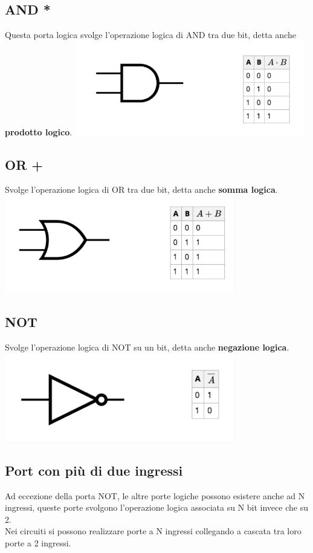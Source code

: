 \documentclass[12pt, a4paper, openany]{book}
\begin{document}
\subsection{AND *}
Questa porta logica svolge l'operazione logica di AND tra due bit, detta anche 
\textbf{prodotto logico}.
\includegraphics[width=100mm, scale=0.6]{tabella_and.png}

\subsection{OR +}
Svolge l'operazione logica di OR tra due bit, detta anche \textbf{somma logica}.
\includegraphics[width=100mm, scale=0.6]{tabella_or.png}

\subsection{NOT}
Svolge l'operazione logica di NOT su un bit, detta anche \textbf{negazione logica}.
\includegraphics[width=100mm, scale=0.6]{tabella not.png}

\subsection{Port con più di due ingressi}
Ad eccezione della porta NOT, le altre porte logiche possono esistere anche ad N ingressi, queste porte
svolgono l'operazione logica associata su N bit invece che su 2.
\\ Nei circuiti si possono realizzare porte a N ingressi collegando a cascata tra loro porte a 2 ingressi.
\end{document}
